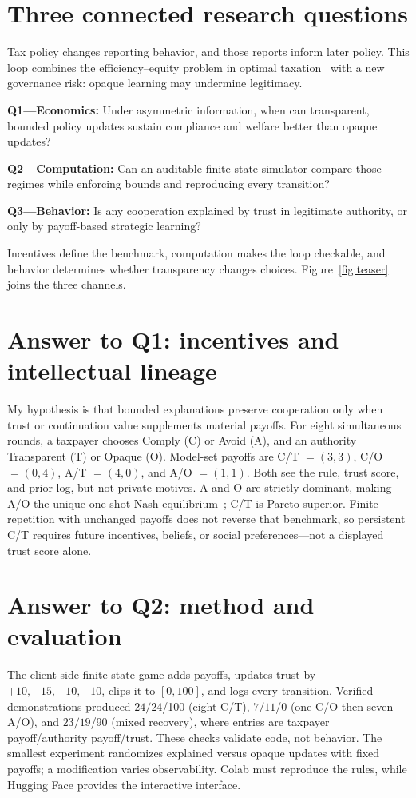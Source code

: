 \section{Three connected research questions}
Tax policy changes reporting behavior, and those reports inform later policy. This loop combines the efficiency--equity problem in optimal taxation~\cite{mirrlees1971,saez2001,nobel1996} with a new governance risk: opaque learning may undermine legitimacy.

\textbf{Q1---Economics:} Under asymmetric information, when can transparent, bounded policy updates sustain compliance and welfare better than opaque updates?\par
\textbf{Q2---Computation:} Can an auditable finite-state simulator compare those regimes while enforcing bounds and reproducing every transition?\par
\textbf{Q3---Behavior:} Is any cooperation explained by trust in legitimate authority, or only by payoff-based strategic learning?\par
Incentives define the benchmark, computation makes the loop checkable, and behavior determines whether transparency changes choices. Figure~\ref{fig:teaser} joins the three channels.

\section{Answer to Q1: incentives and intellectual lineage}
My hypothesis is that bounded explanations preserve cooperation only when trust or continuation value supplements material payoffs. For eight simultaneous rounds, a taxpayer chooses Comply (C) or Avoid (A), and an authority Transparent (T) or Opaque (O). Model-set payoffs are C/T $=(3,3)$, C/O $=(0,4)$, A/T $=(4,0)$, and A/O $=(1,1)$. Both see the rule, trust score, and prior log, but not private motives. A and O are strictly dominant, making A/O the unique one-shot Nash equilibrium~\cite{nash1950}; C/T is Pareto-superior. Finite repetition with unchanged payoffs does not reverse that benchmark, so persistent C/T requires future incentives, beliefs, or social preferences---not a displayed trust score alone.

\section{Answer to Q2: method and evaluation}
The client-side finite-state game adds payoffs, updates trust by $+10,-15,-10,-10$, clips it to $[0,100]$, and logs every transition. Verified demonstrations produced $24/24$/100 (eight C/T), $7/11$/0 (one C/O then seven A/O), and $23/19$/90 (mixed recovery), where entries are taxpayer payoff/authority payoff/trust. These checks validate code, not behavior. The smallest experiment randomizes explained versus opaque updates with fixed payoffs; a modification varies observability. Colab must reproduce the rules, while Hugging Face provides the interactive interface.

